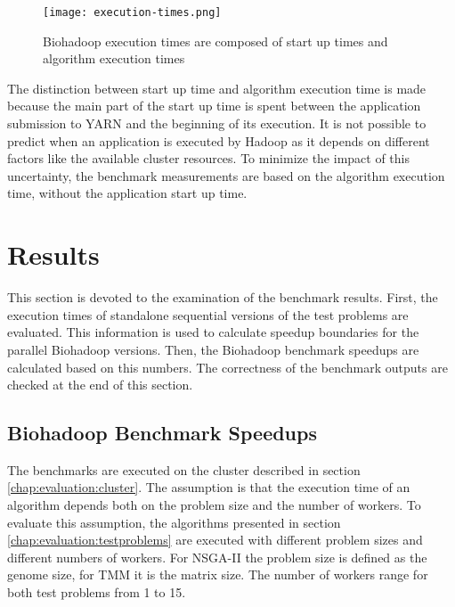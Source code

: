\begin{figure}
  \centering
  \texttt{[image: execution-times.png]}
  \caption[Division of Biohadoop execution times]{Biohadoop execution times are composed of start up times and algorithm execution times}
  \label{fig:execution-times}
\end{figure}

The distinction between start up time and algorithm execution time is made because the main part of the start up time is spent between the application submission to YARN and the beginning of its execution. It is not possible to predict when an application is executed by Hadoop as it depends on different factors like the available cluster resources. To minimize the impact of this uncertainty, the benchmark measurements are based on the algorithm execution time, without the application start up time.


\section{Results}
\label{chap:evaluation:result}
This section is devoted to the examination of the benchmark results. First, the execution times of standalone sequential versions of the test problems are evaluated. This information is used to calculate speedup boundaries for the parallel Biohadoop versions. Then, the Biohadoop benchmark speedups are calculated based on this numbers. The correctness of the benchmark outputs are checked at the end of this section.




\subsection{Biohadoop Benchmark Speedups}
The benchmarks are executed on the cluster described in section \ref{chap:evaluation:cluster}. The assumption is that the execution time of an algorithm depends both on the problem size and the number of workers. To evaluate this assumption, the algorithms presented in section \ref{chap:evaluation:testproblems} are executed with different problem sizes and different numbers of workers. For NSGA-II the problem size is defined as the genome size, for TMM it is the matrix size. The number of workers range for both test problems from 1 to 15.

